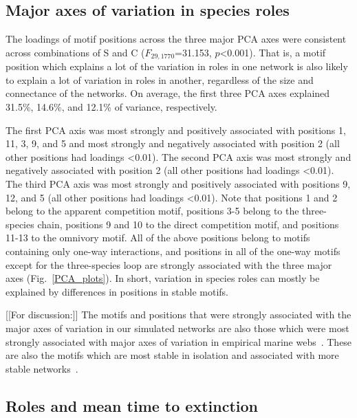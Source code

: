 \documentclass[12pt]{article}
\begin{document}
	\subsection*{Major axes of variation in species roles}

		The loadings of motif positions across the three major PCA axes were consistent across combinations of S and C ($F_{29,1770}$=31.153, $p$\textless0.001). That is, a motif position which explains a lot of the variation in roles in one network is also likely to explain a lot of variation in roles in another, regardless of the size and connectance of the networks. On average, the first three PCA axes explained 31.5\%, 14.6\%, and 12.1\% of variance, respectively.


		The first PCA axis was most strongly and positively associated with positions 1, 11, 3, 9, and 5 and most strongly and negatively associated with position 2 (all other positions had loadings \textless0.01). The second PCA axis was most strongly and negatively associated with position 2 (all other positions had loadings \textless0.01). The third PCA axis was most strongly and positively associated with positions 9, 12, and 5 (all other positions had loadings \textless0.01). Note that positions 1 and 2 belong to the apparent competition motif, positions 3-5 belong to the three-species chain, positions 9 and 10 to the direct competition motif, and positions 11-13 to the omnivory motif. All of the above positions belong to motifs containing only one-way interactions, and positions in all of the one-way motifs except for the three-species loop are strongly associated with the three major axes (Fig.~\ref{PCA_plots}). In short, variation in species roles can mostly be explained by differences in positions in stable motifs.


		[[For discussion:]]
		The motifs and positions that were strongly associated with the major axes of variation in our simulated networks are also those which were most strongly associated with major axes of variation in empirical marine webs~\citep{Cirtwill2018EcolLett}. These are also the motifs which are most stable in isolation and associated with more stable networks~\citep{Stouffer&Borrelli}. %




	\subsection*{Roles and mean time to extinction}
\end{document}
